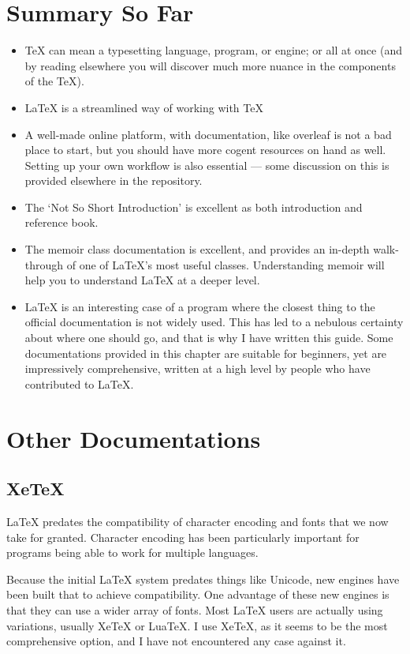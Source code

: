 \documentclass[11pt, oneside]{memoir}
\begin{document}
\section{Summary So Far}
\begin{itemize}
\item \TeX{} can mean a typesetting language, program, or engine; or all at once (and by reading elsewhere you will discover much more nuance in the components of the \TeX{}).
\item \LaTeX{} is a streamlined way of working with \TeX{} 
\item A well-made online platform, with documentation, like overleaf is not a bad place to start, but you should have more cogent resources on hand as well. Setting up your own workflow is also essential — some discussion on this is provided elsewhere in the repository.
\item The `Not So Short Introduction' is excellent as both introduction and reference book.
\item The memoir class documentation is excellent, and provides an in-depth walk-through of one of LaTeX's most useful classes. Understanding memoir will help you to understand LaTeX at a deeper level.
\item \LaTeX{} is an interesting case of a program where the closest thing to the official documentation is not widely used. This has led to a nebulous certainty about where one should go, and that is why I have written this guide. Some documentations provided in this chapter are suitable for beginners, yet are impressively comprehensive, written at a high level by people who have contributed to LaTeX.
\end{itemize}

\section{Other Documentations}
\subsection{XeTeX}

LaTeX predates the compatibility of character encoding and fonts that we now take for granted. Character encoding has been particularly important for programs being able to work for multiple languages.

Because the initial LaTeX system predates things like Unicode, new engines have been built that to achieve compatibility. One advantage of these new engines is that they can use a wider array of fonts. Most LaTeX users are actually using variations, usually XeTeX or LuaTeX. I use XeTeX, as it seems to be the most comprehensive option, and I have not encountered any case against it.
\end{document}
